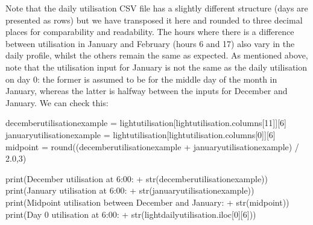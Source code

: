 \documentclass[letterpaper,10pt,english]{sphinxmanual}
\begin{document}
\begin{sphinxVerbatim}[commandchars=\\\{\}]
              
              
              
              
              
              
              
              
              
\end{sphinxVerbatim}

\sphinxAtStartPar
Note that the daily utilisation CSV file has a slightly different
structure (days are presented as rows) but we have transposed it here
and rounded to three decimal places for comparability and readability.
The hours where there is a difference between utilisation in January and
February (hours 6 and 17) also vary in the daily profile, whilst the
others remain the same as expected. As mentioned above, note that the
utilisation input for January is not the same as the daily utilisation
on day 0: the former is assumed to be for the middle day of the month in
January, whereas the latter is halfway between the inputs for December
and January. We can check this:

\begin{sphinxVerbatim}[commandchars=\\\{\}]
december\PYGZus{}utilisation\PYGZus{}example = light\PYGZus{}utilisation[light\PYGZus{}utilisation.columns[11]][6]
january\PYGZus{}utilisation\PYGZus{}example = light\PYGZus{}utilisation[light\PYGZus{}utilisation.columns[0]][6]
midpoint = round((december\PYGZus{}utilisation\PYGZus{}example + january\PYGZus{}utilisation\PYGZus{}example) / 2.0,3)

print(\PYGZsq{}December utilisation at 6:00: \PYGZsq{} + str(december\PYGZus{}utilisation\PYGZus{}example))
print(\PYGZsq{}January utilisation at 6:00: \PYGZsq{} + str(january\PYGZus{}utilisation\PYGZus{}example))
print(\PYGZsq{}Midpoint utilisation between December and January: \PYGZsq{} + str(midpoint))
print(\PYGZsq{}Day 0 utilisation at 6:00: \PYGZsq{} + str(light\PYGZus{}daily\PYGZus{}utilisation.iloc[0][6]))
\end{sphinxVerbatim}
\end{document}
